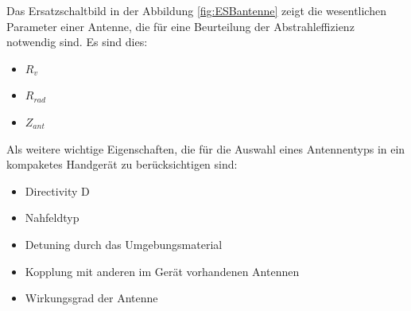 Das Ersatzschaltbild in der Abbildung \ref{fig:ESBantenne} zeigt die wesentlichen Parameter einer Antenne, die für eine Beurteilung der Abstrahleffizienz notwendig sind. Es sind dies:
\begin{itemize}
\item $R_{v}$
\item $R_{rad}$
\item $Z_{ant}$
\end{itemize}
Als weitere wichtige Eigenschaften, die für die Auswahl eines Antennentyps in ein kompaketes Handgerät zu berücksichtigen sind:
\begin{itemize}
\item Directivity D
\item Nahfeldtyp
\item Detuning durch das Umgebungsmaterial
\item Kopplung mit anderen im Gerät vorhandenen Antennen
\item Wirkungsgrad der Antenne
\end{itemize}


